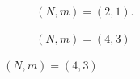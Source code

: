 \documentclass[12pt]{article}
\begin{document}
\begin{figure}
	
	\begin{subfigure}{.47\textwidth}
		\centering
		\caption{\((N,m)=(2,1)\).}
		\label{fig:N2m1}
	\end{subfigure}%
	\quad
	\begin{subfigure}{.47\textwidth}
		\centering
		\caption{\((N,m)=(4,3)\)}
		\label{fig:N4m3}
	\end{subfigure}%
	

\end{figure}
\end{document}
